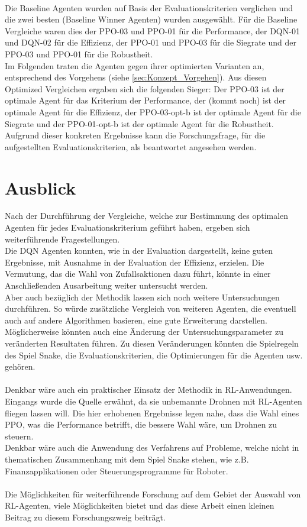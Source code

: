 \\Die Baseline Agenten wurden auf Basis der Evaluationskriterien verglichen und die zwei besten (Baseline Winner Agenten) wurden ausgewählt. Für die Baseline Vergleiche waren dies der PPO-03 und PPO-01 für die Performance, der DQN-01 und DQN-02 für die Effizienz, der PPO-01 und PPO-03 für die Siegrate und der PPO-03 und PPO-01 für die Robustheit.\\
Im Folgenden traten die Agenten gegen ihrer optimierten Varianten an, entsprechend des Vorgehens (siehe \ref{sec:Konzept_Vorgehen}).
Aus diesen Optimized Vergleichen ergaben sich die folgenden Sieger: Der PPO-03 ist der optimale Agent für das Kriterium der Performance, der (kommt noch) ist der optimale Agent für die Effizienz, der PPO-03-opt-b ist der optimale Agent für die Siegrate und der PPO-01-opt-b ist der optimale Agent für die Robustheit.\\
Aufgrund dieser konkreten Ergebnisse kann die Forschungsfrage, für die aufgestellten Evaluationskriterien, als beantwortet angesehen werden.

\section{Ausblick}
Nach der Durchführung der Vergleiche, welche zur Bestimmung des optimalen Agenten für jedes Evaluationskriterium geführt haben, ergeben sich weiterführende Fragestellungen.\\
Die DQN Agenten konnten, wie in der Evaluation dargestellt, keine guten Ergebnisse, mit Ausnahme in der Evaluation der Effizienz, erzielen. Die Vermutung, das die Wahl von Zufallsaktionen dazu führt, könnte in einer Anschließenden Ausarbeitung weiter untersucht werden.\\
Aber auch bezüglich der Methodik lassen sich noch weitere Untersuchungen durchführen. 
So würde zusätzliche Vergleich von weiteren Agenten, die eventuell auch auf andere Algorithmen basieren, eine gute Erweiterung darstellen.\\
Möglicherweise könnten auch eine Änderung der Untersuchungsparameter zu veränderten Resultaten führen. Zu diesen Veränderungen könnten die Spielregeln des Spiel Snake, die Evaluationskriterien, die Optimierungen für die Agenten usw. gehören.\\
\\Denkbar wäre auch ein praktischer Einsatz der Methodik in RL-Anwendungen. Eingangs wurde die Quelle \cite{UAV} erwähnt, da sie unbemannte Drohnen mit RL-Agenten fliegen lassen will. Die hier erhobenen Ergebnisse legen nahe, dass die Wahl eines PPO, was die Performance betrifft, die bessere Wahl wäre, um Drohnen zu steuern.\\
Denkbar wäre auch die Anwendung des Verfahrens auf Probleme, welche nicht in thematischen Zusammenhang mit dem Spiel Snake stehen, wie z.B. Finanzapplikationen oder Steuerungsprogramme für Roboter.\\
\\Die Möglichkeiten für weiterführende Forschung auf dem Gebiet der Auswahl von RL-Agenten, viele Möglichkeiten bietet und das diese Arbeit einen kleinen Beitrag zu diesem Forschungszweig beiträgt.